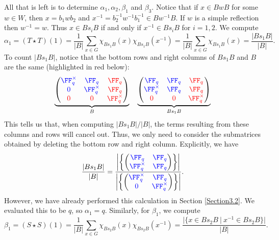 \documentclass[11pt]{amsart}
\theoremstyle{remark}
\begin{document}
All that is left is to determine $\alpha_1, \alpha_2, \beta_1$ and $\beta_3$.
Notice that if $x\in BwB$ for some $w\in W$, then $x=b_1wb_2$ and $x^{-1} = b_2^{-1}w^{-1}b_1^{-1}\in Bw^{-1}B$.
If $w$ is a simple reflection then $w^{-1}=w$.
Thus $x\in Bs_iB$ if and only if $x^{-1}\in Bs_iB$ for $i=1,2$.
We compute
\[
	\alpha_1 = (T\star T)(1) = \frac{1}{|B|}\sum_{x\in G} \chi_{Bs_1B}(x)\chi_{Bs_1B}(x^{-1}) = \frac{1}{|B|}\sum_{x\in G} \chi_{Bs_1B}(x) = \frac{|Bs_1B|}{|B|}.
\]
To count $|Bs_1B|$, notice that the bottom rows and right columns of $Bs_1B$ and $B$ are the same (highlighted in {\color{red} red} below):
\[
	\underbrace{\begin{pmatrix}
			\color{blue}\FF_q^\times & \color{blue}\FF_q        & \color{red}\FF_q        \\
			\color{blue}0            & \color{blue}\FF_q^\times & \color{red}\FF_q        \\
			\color{red}0             & \color{red}0             & \color{red}\FF_q^\times
		\end{pmatrix}}_{B}\quad \underbrace{\begin{pmatrix}
			\color{blue}\FF_q        & \color{blue}\FF_q & \color{red}\FF_q        \\
			\color{blue}\FF_q^\times & \color{blue}\FF_q & \color{red}\FF_q        \\
			\color{red}0             & \color{red}0      & \color{red}\FF_q^\times
		\end{pmatrix}}_{Bs_1B}
\]
This tells us that, when computing $|Bs_1B|/|B|$, the terms resulting from these columns and rows will cancel out.
Thus, we only need to consider the submatrices obtained by deleting the bottom row and right column.
Explicitly, we have
\[
	\frac{|Bs_1B|}{|B|} = \frac{\left|\left\{\begin{pmatrix} \color{blue}\FF_q & \color{blue}\FF_q \\ \color{blue}\FF_q^\times & \color{blue}\FF_q \end{pmatrix}\right\}\right|}{\left|\left\{\begin{pmatrix} \color{blue}\FF_q^\times & \color{blue}\FF_q \\ \color{blue}0 & \color{blue}\FF_q^\times \end{pmatrix}\right\}\right|}.
\]
However, we have already performed this calculation in Section \ref{Section3.2}.
We evaluated this to be $q$, so $\alpha_1 = q$.
Similarly, for $\beta_1$, we compute
\[
	\beta_1 = (S\star S)(1) = \frac{1}{|B|}\sum_{x\in G} \chi_{Bs_2B}(x)\chi_{Bs_2B}(x^{-1}) = \frac{|\{x\in Bs_2B\ |\ x^{-1}\in Bs_2 B\}|}{|B|}.
\]
\end{document}
